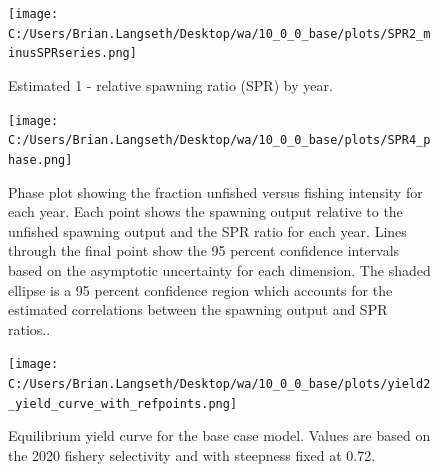 \documentclass[11pt,
  english,
  a4paper,
]{article}
\begin{document}
\begin{figure}
\centering
\texttt{[image: C:/Users/Brian.Langseth/Desktop/wa/10\_0\_0\_base/plots/SPR2\_minusSPRseries.png]}
\caption{Estimated 1 - relative spawning ratio (SPR) by year.\label{fig:1-spr}}
\end{figure}

\tagmcend\tagstructend


\begin{figure}
\centering
\texttt{[image: C:/Users/Brian.Langseth/Desktop/wa/10\_0\_0\_base/plots/SPR4\_phase.png]}
\caption{Phase plot showing the fraction unfished versus fishing intensity for each year. Each point shows the spawning output relative to the unfished spawning output and the SPR ratio for each year. Lines through the final point show the 95 percent confidence intervals based on the asymptotic uncertainty for each dimension. The shaded ellipse is a 95 percent confidence region which accounts for the estimated correlations between the spawning output and SPR ratios..\label{fig:phase-plot}}
\end{figure}

\tagmcend\tagstructend


\begin{figure}
\centering
\texttt{[image: C:/Users/Brian.Langseth/Desktop/wa/10\_0\_0\_base/plots/yield2\_yield\_curve\_with\_refpoints.png]}
\caption{Equilibrium yield curve for the base case model. Values are based on the 2020 fishery selectivity and with steepness fixed at 0.72.\label{fig:yield}}
\end{figure}

\tagmcend\tagstructend

\newpage

\clearpage
\end{document}
